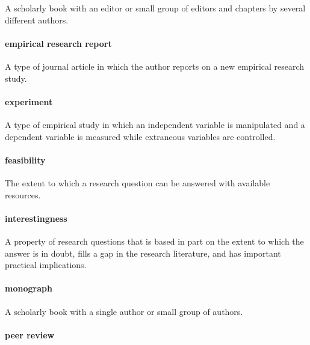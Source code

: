\documentclass[
]{krantz}
\begin{document}
A scholarly book with an editor or small group of editors and chapters by several different authors.

\paragraph*{empirical research report}\label{empirical-research-report}

A type of journal article in which the author reports on a new empirical research study.

\paragraph*{experiment}\label{experiment-2}

A type of empirical study in which an independent variable is manipulated and a dependent variable is measured while extraneous variables are controlled.

\paragraph*{feasibility}\label{feasibility-1}

The extent to which a research question can be answered with available resources.

\paragraph*{interestingness}\label{interestingness-1}

A property of research questions that is based in part on the extent to which the answer is in doubt, fills a gap in the research literature, and has important practical implications.

\paragraph*{monograph}\label{monograph}

A scholarly book with a single author or small group of authors.

\paragraph*{peer review}\label{peer-review}
\end{document}
